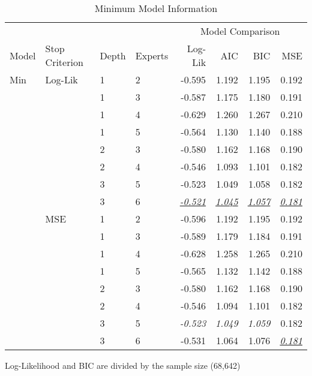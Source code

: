\documentclass[12pt]{article}
\newcommand{\ti}[1]{\textit{#1}}
\newcommand{\iu}[1]{\underline{\textit{#1}}}
\newcommand{\T}{\rule{0pt}{2.5ex}}       %
\begin{document}
\begin{table} \centering
  \caption{Minimum Model Information}
  \begin{threeparttable}
    {\footnotesize
    \begin{tabular}[r]{l l l l r r r r}
  \cmidrule{1-8}
        &            &        &         &  \multicolumn{4}{c}{Model Comparison} \\ 
   \cmidrule(l){5-8}
Model   & Stop Criterion  &  Depth & Experts & Log-Lik & AIC    & BIC    & MSE   \\ 
  \cmidrule{1-8}
  
Min     &  Log-Lik   &   1    &    2    & -0.595  & 1.192  & 1.195  & 0.192 \\
        &            &   1    &    3    & -0.587  & 1.175  & 1.180  & 0.191 \\
        &            &   1    &    4    & -0.629  & 1.260  & 1.267  & 0.210 \\
        &            &   1    &    5    & -0.564  & 1.130  & 1.140  & 0.188 \\
        &            &   2    &    3    & -0.580  & 1.162  & 1.168  & 0.190 \\
        &            &   2    &    4    & -0.546  & 1.093  & 1.101  & 0.182 \\
        &            &   3    &    5    & -0.523  & 1.049  & 1.058  & 0.182 \\
        &            &   3    &    6    & \iu{-0.521}  & \iu{1.045}  & \iu{1.057}  & \iu{0.181} \\ \T
        &  MSE       &   1    &    2    & -0.596  & 1.192  & 1.195  & 0.192 \\
        &            &   1    &    3    & -0.589  & 1.179  & 1.184  & 0.191 \\
        &            &   1    &    4    & -0.628  & 1.258  & 1.265  & 0.210 \\
        &            &   1    &    5    & -0.565  & 1.132  & 1.142  & 0.188 \\
        &            &   2    &    3    & -0.580  & 1.162  & 1.168  & 0.190 \\
        &            &   2    &    4    & -0.546  & 1.094  & 1.101  & 0.182 \\
        &            &   3    &    5    & \ti{-0.523}  & \ti{1.049}  & \ti{1.059}  & 0.182 \\
        &            &   3    &    6    & -0.531  & 1.064  & 1.076  & \iu{0.181} \\
  \cmidrule(l){1-8}
    \end{tabular}
    }
    \begin{tablenotes}
      \item{\footnotesize Log-Likelihood and BIC are divided by the sample size (68,642)}
    \end{tablenotes} \label{tbl:HME_spec_min}
  \end{threeparttable}
\end{table}
\end{document}
